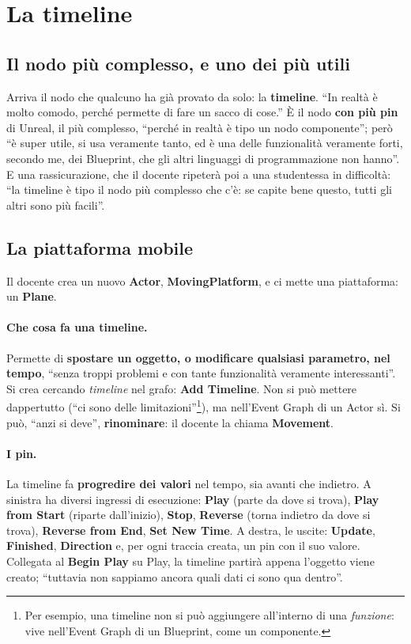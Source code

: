 \section{La timeline}
\label{gd12:sec:timeline}

\subsection{Il nodo più complesso, e uno dei più utili}

Arriva il nodo che qualcuno ha già provato da solo: la \textbf{timeline}. ``In
realtà è molto comodo, perché permette di fare un sacco di cose.'' È il nodo
\textbf{con più pin} di Unreal, il più complesso, ``perché in realtà è tipo un
nodo componente''; però ``è super utile, si usa veramente tanto, ed è una delle
funzionalità veramente forti, secondo me, dei Blueprint, che gli altri linguaggi
di programmazione non hanno''. E una rassicurazione, che il docente ripeterà
poi a una studentessa in difficoltà: ``la timeline è tipo il nodo più complesso
che c'è: se capite bene questo, tutti gli altri sono più facili''.

\subsection{La piattaforma mobile}

Il docente crea un nuovo \textbf{Actor}, \textbf{MovingPlatform}, e ci mette una
piattaforma: un \textbf{Plane}.

\paragraph{Che cosa fa una timeline.} Permette di \textbf{spostare un oggetto, o
modificare qualsiasi parametro, nel tempo}, ``senza troppi problemi e con tante
funzionalità veramente interessanti''. Si crea cercando \emph{timeline} nel
grafo: \textbf{Add Timeline}. Non si può mettere dappertutto (``ci sono delle
limitazioni''\footnote{Per esempio, una timeline non si può aggiungere
all'interno di una \emph{funzione}: vive nell'Event Graph di un Blueprint, come
un componente.}), ma nell'Event Graph di un Actor sì. Si può, ``anzi si deve'',
\textbf{rinominare}: il docente la chiama \textbf{Movement}.

\paragraph{I pin.} La timeline fa \textbf{progredire dei valori} nel tempo, sia
avanti che indietro. A sinistra ha diversi ingressi di esecuzione:
\textbf{Play} (parte da dove si trova), \textbf{Play from Start} (riparte
dall'inizio), \textbf{Stop}, \textbf{Reverse} (torna indietro da dove si
trova), \textbf{Reverse from End}, \textbf{Set New Time}. A destra, le uscite:
\textbf{Update}, \textbf{Finished}, \textbf{Direction} e, per ogni traccia
creata, un pin con il suo valore. Collegata al \textbf{Begin Play} su Play, la
timeline partirà appena l'oggetto viene creato; ``tuttavia non sappiamo ancora
quali dati ci sono qua dentro''.

